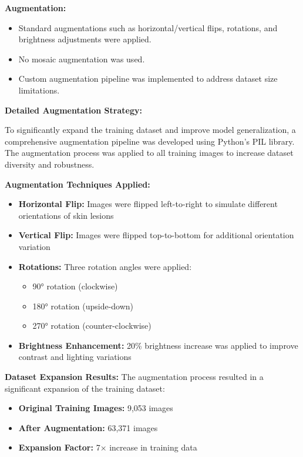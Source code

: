 \documentclass[a4paper,12pt]{report}
\begin{document}
\begin{spacing}{1.5}
    \textbf{Augmentation:}
    \begin{itemize}
        \item Standard augmentations such as horizontal/vertical flips, rotations, and brightness adjustments were applied.
        \item No mosaic augmentation was used.
        \item Custom augmentation pipeline was implemented to address dataset size limitations.
    \end{itemize}
    
    \textbf{Detailed Augmentation Strategy:}

    To significantly expand the training dataset and improve model generalization, a comprehensive augmentation pipeline was developed using Python's PIL library. The augmentation process was applied to all training images to increase dataset diversity and robustness.
    
    \textbf{Augmentation Techniques Applied:}
    \begin{itemize}
        \item \textbf{Horizontal Flip:} Images were flipped left-to-right to simulate different orientations of skin lesions
        \item \textbf{Vertical Flip:} Images were flipped top-to-bottom for additional orientation variation
        \item \textbf{Rotations:} Three rotation angles were applied:
        \begin{itemize}
            \item 90° rotation (clockwise)
            \item 180° rotation (upside-down)
            \item 270° rotation (counter-clockwise)
        \end{itemize}
        \item \textbf{Brightness Enhancement:} 20\% brightness increase was applied to improve contrast and lighting variations
    \end{itemize}
    
    \textbf{Dataset Expansion Results:}
    The augmentation process resulted in a significant expansion of the training dataset:
    \begin{itemize}
        \item \textbf{Original Training Images:} 9,053 images
        \item \textbf{After Augmentation:} 63,371 images
        \item \textbf{Expansion Factor:} 7× increase in training data
    \end{itemize}
    

\end{spacing}
\end{document}
